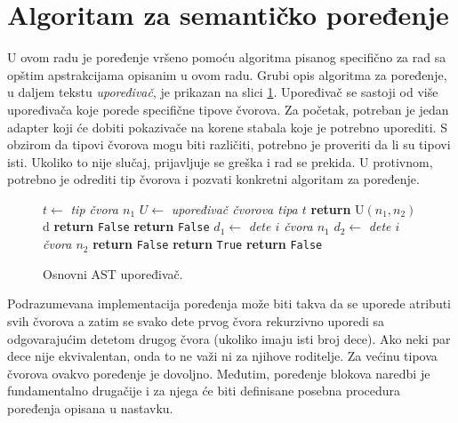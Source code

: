 \section{Algoritam za semantičko poređenje}
\label{sec:ASTComparingAlgorithm}

U ovom radu je poređenje vršeno pomoću algoritma pisanog specifično za rad sa opštim apstrakcijama opisanim u ovom radu. Grubi opis algoritma za poređenje, u daljem tekstu \emph{upoređivač}, je prikazan na slici \ref{fig:ComparisonAlgorithmPseudo}. Upoređivač se sastoji od više upoređivača koje porede specifične tipove čvorova. Za početak, potreban je jedan adapter koji će dobiti pokazivače na korene stabala koje je potrebno uporediti. S obzirom da tipovi čvorova mogu biti različiti, potrebno je proveriti da li su tipovi isti. Ukoliko to nije slučaj, prijavljuje se greška i rad se prekida. U protivnom, potrebno je odrediti tip čvorova i pozvati konkretni algoritam za poređenje. 

\begin{figure}[!h]
\begin{algorithmic}[1]
    \State $t \gets$ \emph{tip čvora $n_1$}
        \State $U \gets$ \emph{upoređivač čvorova tipa $t$}
        \State \textbf{return} U$(n_1, n_2)$
    \Else
        d
            \State \textbf{return} \texttt{False}
        \Else        
                \State \textbf{return} \texttt{False}
            \EndIf
                \State $d_1 \gets $ \emph{dete $i$ čvora $n_1$}
                \State $d_2 \gets $ \emph{dete $i$ čvora $n_2$}
                    \State \textbf{return} \texttt{False}
                \EndIf
            \EndFor
            \State \textbf{return} \texttt{True}
        \EndIf
    \EndIf
\Else
    \State \textbf{return} \texttt{False}
\EndIf
\EndProcedure
\end{algorithmic}
\caption{Osnovni AST upoređivač.}
\label{fig:ComparisonAlgorithmPseudo}
\end{figure}

Podrazumevana implementacija poređenja može biti takva da se uporede atributi svih čvorova a zatim se svako dete prvog čvora rekurzivno uporedi sa odgovarajućim detetom drugog čvora (ukoliko imaju isti broj dece). Ako neki par dece nije ekvivalentan, onda to ne važi ni za njihove roditelje. Za većinu tipova čvorova ovakvo poređenje je dovoljno. Međutim, poređenje blokova naredbi je fundamentalno drugačije i za njega će biti definisane posebna procedura poređenja opisana u nastavku.


